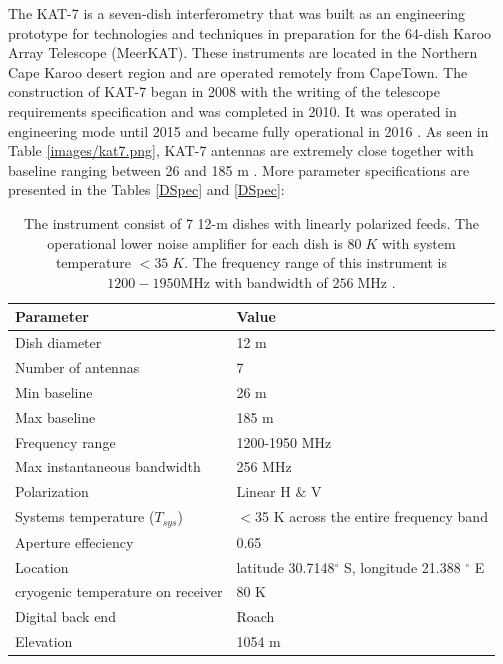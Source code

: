 The KAT-7 is a seven-dish interferometry that was built as an engineering prototype for technologies and techniques in preparation for the 64-dish Karoo Array Telescope (MeerKAT). These instruments are located in the Northern Cape Karoo desert region and are operated remotely from CapeTown. The construction of  KAT-7 began in
2008 with the writing of the telescope requirements specification and was completed in 2010.  It was operated in engineering mode until 2015  and became fully operational in 2016  \citep{foley2016engineering}. As seen in Table \ref{images/kat7.png}, KAT-7 antennas are extremely close together with baseline ranging between 26 and 185 m \citep{carignan2013kat}. More parameter specifications are presented in the Tables \ref{DSpec} and \ref{DSpec}:
\begin{table}[H]\centering
\begin{tabular}{l l }
\toprule
\textbf{Parameter} & \textbf{Value}\\
\midrule
Dish diameter&12 m \\
Number of antennas& 7\\
Min baseline & 26 m\\
Max baseline & 185 m\\
Frequency range & 1200-1950 MHz\\
Max instantaneous bandwidth &256 MHz\\
Polarization   & Linear H $\&$ V\\
Systems temperature ($T_{sys}$) & $<$35 K across the entire frequency band\\
Aperture effeciency & 0.65\\
Location &  latitude 30.7148$^{\circ}$ S, longitude 21.388 $^{\circ}$ E\\
cryogenic temperature on receiver & 80 K\\
Digital back end & Roach \\
Elevation & 1054 m\\
\bottomrule
\end{tabular}
\caption{The instrument consist of 7 12-m dishes with linearly polarized feeds. The operational lower noise amplifier for each dish is $80\;K$  with system temperature $<35\;K$. The frequency range of this instrument is $1200-1950 \text{MHz}$ with bandwidth of $256\;\text{MHz}$ \citep{foley2016engineering}.}
\label{K7 spec}
\end{table}

